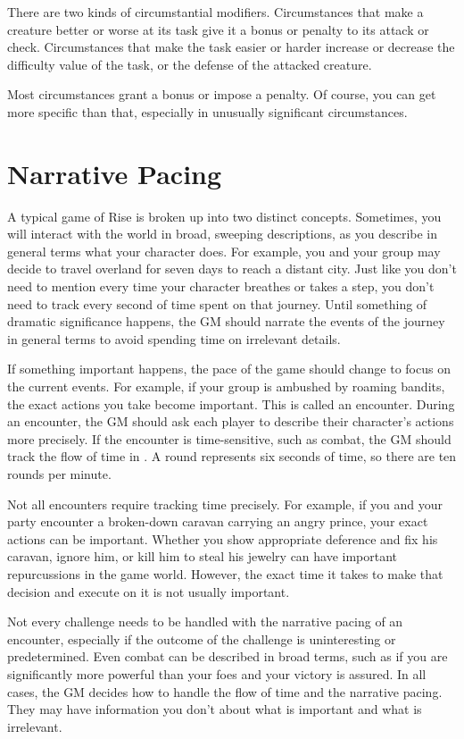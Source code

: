   There are two kinds of circumstantial modifiers.
  Circumstances that make a creature better or worse at its task give it a bonus or penalty to its attack or check.
  Circumstances that make the task easier or harder increase or decrease the difficulty value of the task, or the defense of the attacked creature.

  Most circumstances grant a  bonus or impose a  penalty.
  Of course, you can get more specific than that, especially in unusually significant circumstances.

\section{Narrative Pacing}
  A typical game of Rise is broken up into two distinct concepts.
  Sometimes, you will interact with the world in broad, sweeping descriptions, as you describe in general terms what your character does.
  For example, you and your group may decide to travel overland for seven days to reach a distant city.
  Just like you don't need to mention every time your character breathes or takes a step, you don't need to track every second of time spent on that journey.
  Until something of dramatic significance happens, the GM should narrate the events of the journey in general terms to avoid spending time on irrelevant details.

  If something important happens, the pace of the game should change to focus on the current events.
  For example, if your group is ambushed by roaming bandits, the exact actions you take become important.
  This is called an encounter.
  During an encounter, the GM should ask each player to describe their character's actions more precisely.
  If the encounter is time-sensitive, such as combat, the GM should track the flow of time in .
  A round represents six seconds of time, so there are ten rounds per minute.

  Not all encounters require tracking time precisely.
  For example, if you and your party encounter a broken-down caravan carrying an angry prince, your exact actions can be important.
  Whether you show appropriate deference and fix his caravan, ignore him, or kill him to steal his jewelry can have important repurcussions in the game world.
  However, the exact time it takes to make that decision and execute on it is not usually important.

  Not every challenge needs to be handled with the narrative pacing of an encounter, especially if the outcome of the challenge is uninteresting or predetermined.
  Even combat can be described in broad terms, such as if you are significantly more powerful than your foes and your victory is assured.
  In all cases, the GM decides how to handle the flow of time and the narrative pacing.
  They may have information you don't about what is important and what is irrelevant.

